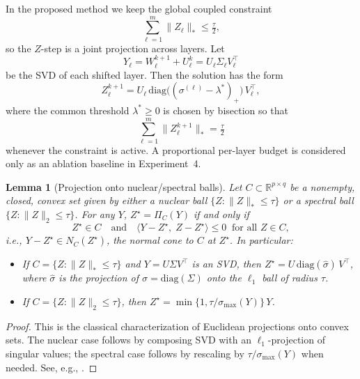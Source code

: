 \documentclass[a4paper,fleqn]{cas-sc}
\newtheorem{lemma}[theorem]{Lemma}
\theoremstyle{remark}
\theoremstyle{definition}
\begin{document}
In the proposed method we keep the global coupled constraint
\[
\sum_{\ell=1}^{m}\|Z_\ell\|_*\le \tfrac{\tau}{2},
\]
so the $Z$-step is a joint projection across layers. Let
\[
Y_\ell=W_\ell^{k+1}+U_\ell^k = U_\ell \Sigma_\ell V_\ell^\top
\]
be the SVD of each shifted layer. Then the solution has the form
\[
Z_\ell^{k+1}
=
U_\ell \,\mathrm{diag}\!\big((\sigma^{(\ell)}-\lambda^*)_+\big)\,V_\ell^\top,
\]
where the common threshold $\lambda^*\ge 0$ is chosen by bisection so that
\[
\sum_{\ell=1}^{m}\|Z_\ell^{k+1}\|_*=\tfrac{\tau}{2}
\]
whenever the constraint is active. A proportional per-layer budget is considered only as an ablation baseline in Experiment~4.
\begin{lemma}[Projection onto nuclear/spectral balls]\label{lem:proj-opt}
Let $C\subset\mathbb{R}^{p\times q}$ be a nonempty, closed, convex set given by either
a nuclear ball $\{Z:\|Z\|_{\ast}\le \tau\}$ or a spectral ball $\{Z:\|Z\|_{2}\le \tau\}$. For any $Y$, $Z^\star=\Pi_C(Y)$ if and only if
\[
  Z^\star \in C
  \quad\text{and}\quad
  \langle Y-Z^\star,\; Z-Z^\star\rangle \le 0\;\;\text{for all } Z\in C,
\]
i.e., $Y-Z^\star\in N_C(Z^\star)$, the normal cone to $C$ at $Z^\star$. In particular:
\begin{itemize}
  \item If $C=\{Z:\|Z\|_{\ast}\le \tau\}$ and $Y=U\Sigma V^\top$ is an SVD, then $Z^\star = U\,\mathrm{diag}(\widehat{\sigma})\,V^\top$, where $\widehat{\sigma}$ is the projection of $\sigma=\mathrm{diag}(\Sigma)$ onto the $\ell_1$ ball of radius $\tau$.
  \item If $C=\{Z:\|Z\|_{2}\le \tau\}$, then $Z^\star = \min\{1,\tau/\sigma_{\max}(Y)\}\,Y$.
\end{itemize}
\end{lemma}

\begin{proof}
This is the classical characterization of Euclidean projections onto convex sets. The nuclear case follows by composing SVD with an $\ell_1$-projection of singular values; the spectral case follows by rescaling by $\tau/\sigma_{\max}(Y)$ when needed. See, e.g., \cite{Cai2010SVT,Duchi2008L1proj}.
\end{proof}
\end{document}
